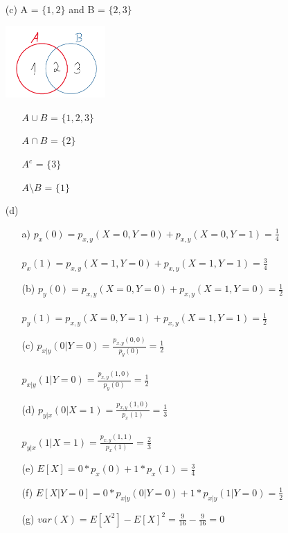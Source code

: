 \documentclass[a4paper]{article}
\begin{document}
\begin{itemize}
\begin{itemize}
\end{itemize}
\item[(c)]A = $\{1,2\}$ and B = $\{2,3\}$
\begin{center}
\includegraphics[width=0.3\textwidth]{images/venn.PNG}\\[1cm] 
\end{center}
\begin{itemize}
\item[$A \cup B$] = $\{1,2,3\}$
\item[$A \cap B$] = $\{2\}$
\item[$A^{c}$] = $\{3\}$
\item[$A \setminus B$] = $\{1\}$
\end{itemize}
\item[(d)]
\begin{itemize}
\item[a)]$p_{x}(0)= p_{x,y}(X=0,Y=0)+p_{x,y}(X=0,Y=1)=\frac{1}{4} $\\\\
$p_{x}(1)= p_{x,y}(X=1,Y=0)+p_{x,y}(X=1,Y=1)=\frac{3}{4} $\\
\item[(b)]$p_{y}(0)= p_{x,y}(X=0,Y=0)+p_{x,y}(X=1,Y=0)=\frac{1}{2} $\\\\
$p_{y}(1)= p_{x,y}(X=0,Y=1)+p_{x,y}(X=1,Y=1)=\frac{1}{2} $\\
\item[(c)]$p_{x|y}(0|Y=0)=  \frac{p_{x,y}(0,0)}{p_{y}(0)} =\frac{1}{2} $\\\\
$p_{x|y}(1|Y=0)=  \frac{p_{x,y}(1,0)}{p_{y}(0)} =\frac{1}{2} $\\
\item[(d)]$p_{y|x}(0|X=1)=  \frac{p_{x,y}(1,0)}{p_{x}(1)} =\frac{1}{3} $\\\\
$p_{y|x}(1|X=1)=  \frac{p_{x,y}(1,1)}{p_{x}(1)} =\frac{2}{3} $\\
\item[(e)]$E\left[X\right] = 0*p_{x}(0)+1*p_{x}(1)=\frac{3}{4}$\\
\item[(f)]$E\left[X|Y=0\right] = 0*p_{x|y}(0|Y=0)+1*p_{x|y}(1|Y=0)=\frac{1}{2}$\\
\item[(g)]$var(X)= E\left[X^{2}\right] - E\left[X\right]^{2} = \frac{9}{16} - \frac{9}{16} = 0$  
\end{itemize}
\end{itemize}
\end{document}
